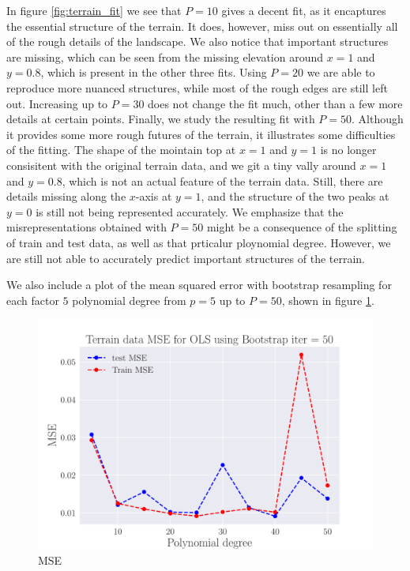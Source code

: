 \documentclass[reprint,english,notitlepage,aps,nobalancelastpage,nofootinbib]{revtex4-1}  %
\begin{document}
In figure \ref{fig:terrain_fit} we see that $P=10$ gives a decent fit, as it encaptures the essential structure of the terrain. It does, however, miss out on essentially all of the rough details of the landscape. We also notice that important structures are missing, which can be seen from the missing elevation around $x=1$ and $y=0.8$, which is present in the other three fits. Using $P=20$ we are able to reproduce more nuanced structures, while most of the rough edges are still left out. Increasing up to $P=30$ does not change the fit much, other than a few more details at certain points. Finally, we study the resulting fit with $P=50$. Although it provides some more rough futures of the terrain, it illustrates some difficulties of the fitting. The shape of the mointain top at $x=1$ and $y=1$ is no longer consisitent with the original terrain data, and we git a tiny vally around $x=1$ and $y=0.8$, which is not an actual feature of the terrain data. Still, there are details missing along the $x$-axis at $y=1$, and the structure of the two peaks at $y=0$ is still not being represented accurately. We emphasize that the misrepresentations obtained with $P=50$ might be a consequence of the splitting of train and test data, as well as that prticalur ploynomial degree. However, we are still not able to accurately predict important structures of the terrain.

We also include a plot of the mean squared error with bootstrap resampling for each factor $5$ polynomial degree from $p=5$ up to $P=50$, shown in figure \ref{fig:terrain_MSE_bootstrap_p50}.

\begin{figure}[H]
  \includegraphics[width=\linewidth]{SRTM_MSE_OLS_n50_pol50_Bootstrap_re50.pdf}
  \caption{MSE}
  \label{fig:terrain_MSE_bootstrap_p50}
\end{figure}
\end{document}
